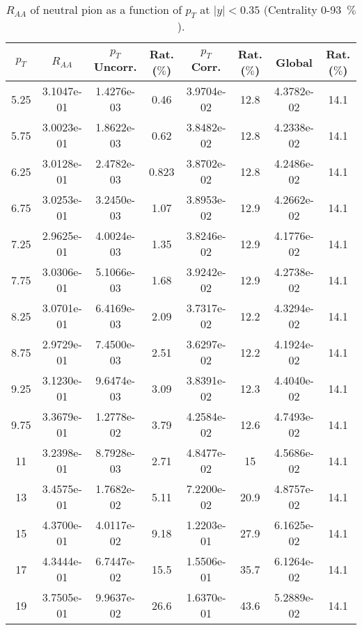             
\begin{table}[!htb]
\centering
\begin{tabular}{|c|c|c|c|c|c|c|c|}
\hline
$p_{T}$ & $R_{AA}$ & $p_{T}$ Uncorr. & Rat. ($\%$) & $p_{T}$ Corr. & Rat. ($\%$) & Global & Rat. ($\%$)\\
\hline
5.25 & 3.1047e-01 & 1.4276e-03 & 0.46 & 3.9704e-02 & 12.8 & 4.3782e-02 & 14.1 \\ 
5.75 & 3.0023e-01 & 1.8622e-03 & 0.62 & 3.8482e-02 & 12.8 & 4.2338e-02 & 14.1 \\ 
6.25 & 3.0128e-01 & 2.4782e-03 & 0.823 & 3.8702e-02 & 12.8 & 4.2486e-02 & 14.1 \\ 
6.75 & 3.0253e-01 & 3.2450e-03 & 1.07 & 3.8953e-02 & 12.9 & 4.2662e-02 & 14.1 \\ 
7.25 & 2.9625e-01 & 4.0024e-03 & 1.35 & 3.8246e-02 & 12.9 & 4.1776e-02 & 14.1 \\ 
7.75 & 3.0306e-01 & 5.1066e-03 & 1.68 & 3.9242e-02 & 12.9 & 4.2738e-02 & 14.1 \\ 
8.25 & 3.0701e-01 & 6.4169e-03 & 2.09 & 3.7317e-02 & 12.2 & 4.3294e-02 & 14.1 \\ 
8.75 & 2.9729e-01 & 7.4500e-03 & 2.51 & 3.6297e-02 & 12.2 & 4.1924e-02 & 14.1 \\ 
9.25 & 3.1230e-01 & 9.6474e-03 & 3.09 & 3.8391e-02 & 12.3 & 4.4040e-02 & 14.1 \\ 
9.75 & 3.3679e-01 & 1.2778e-02 & 3.79 & 4.2584e-02 & 12.6 & 4.7493e-02 & 14.1 \\ 
11 & 3.2398e-01 & 8.7928e-03 & 2.71 & 4.8477e-02 & 15 & 4.5686e-02 & 14.1 \\ 
13 & 3.4575e-01 & 1.7682e-02 & 5.11 & 7.2200e-02 & 20.9 & 4.8757e-02 & 14.1 \\ 
15 & 4.3700e-01 & 4.0117e-02 & 9.18 & 1.2203e-01 & 27.9 & 6.1625e-02 & 14.1 \\ 
17 & 4.3444e-01 & 6.7447e-02 & 15.5 & 1.5506e-01 & 35.7 & 6.1264e-02 & 14.1 \\ 
19 & 3.7505e-01 & 9.9637e-02 & 26.6 & 1.6370e-01 & 43.6 & 5.2889e-02 & 14.1 \\ 
\hline
\end{tabular}
\caption{$R_{AA}$ of neutral pion as a function of $p_{T}$ at $|y|<0.35$ (Centrality 0-93~$\%$).}
\end{table}
            
